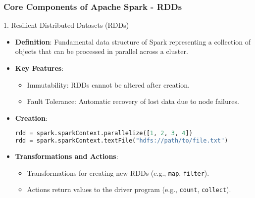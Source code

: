 \documentclass[aspectratio=169]{beamer}
\begin{document}
\begin{frame}[fragile]
    \frametitle{Core Components of Apache Spark - RDDs}
    \begin{block}{1. Resilient Distributed Datasets (RDDs)}
        \begin{itemize}
            \item \textbf{Definition}: Fundamental data structure of Spark representing a collection of objects that can be processed in parallel across a cluster.
            \item \textbf{Key Features}:
                \begin{itemize}
                    \item Immutability: RDDs cannot be altered after creation.
                    \item Fault Tolerance: Automatic recovery of lost data due to node failures.
                \end{itemize}
            \item \textbf{Creation}:
                \begin{lstlisting}[language=Python]
rdd = spark.sparkContext.parallelize([1, 2, 3, 4])
rdd = spark.sparkContext.textFile("hdfs://path/to/file.txt")
                \end{lstlisting}
            \item \textbf{Transformations and Actions}:
                \begin{itemize}
                    \item Transformations for creating new RDDs (e.g., \texttt{map}, \texttt{filter}).
                    \item Actions return values to the driver program (e.g., \texttt{count}, \texttt{collect}).
                \end{itemize}
        \end{itemize}
    \end{block}
\end{frame}
\end{document}
